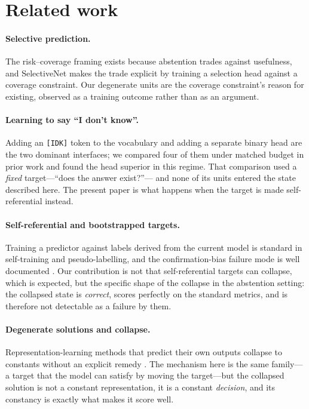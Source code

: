 \documentclass[11pt,a4paper]{article}
\begin{document}
\section{Related work}
\label{sec:related}

\paragraph{Selective prediction.} The risk--coverage framing
\citep{elyaniv2010selective, geifman2017selective} exists because abstention trades against
usefulness, and SelectiveNet \citep{geifman2019selectivenet} makes the trade explicit by training a
selection head against a coverage constraint. Our degenerate units are the coverage constraint's
reason for existing, observed as a training outcome rather than as an argument.

\paragraph{Learning to say ``I don't know''.} Adding an \texttt{[IDK]} token to the vocabulary
\citep{cohen2024idk} and adding a separate binary head are the two dominant interfaces; we compared
four of them under matched budget in prior work \citep{speranza2026abstention} and found the head
superior in this regime. That comparison used a \emph{fixed} target---``does the answer exist?''---
and none of its units entered the state described here. The present paper is what happens when the
target is made self-referential instead.

\paragraph{Self-referential and bootstrapped targets.} Training a predictor against labels derived
from the current model is standard in self-training and pseudo-labelling, and the confirmation-bias
failure mode is well documented \citep{arazo2020pseudo}. Our contribution is not that
self-referential targets can collapse, which is expected, but the specific shape of the collapse in
the abstention setting: the collapsed state is \emph{correct}, scores perfectly on the standard
metrics, and is therefore not detectable as a failure by them.

\paragraph{Degenerate solutions and collapse.} Representation-learning methods that predict their own
outputs collapse to constants without an explicit remedy \citep{grill2020byol, chen2021simsiam}. The
mechanism here is the same family---a target that the model can satisfy by moving the target---but
the collapsed solution is not a constant representation, it is a constant \emph{decision}, and its
constancy is exactly what makes it score well.
\end{document}
